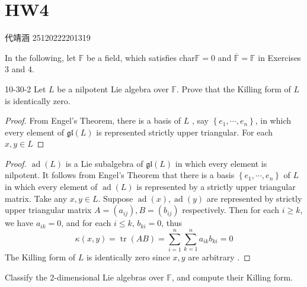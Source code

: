 \documentclass[../main.tex]{subfiles}
\begin{document}
\ifSubfilesClassLoaded{

    
    \setcounter{chapter}{3}
}{}

\chapter{ HW4 }
代靖涵 25120222201319




In the following, let $\mathbb{F}$ be a field, which satisfies char$\mathbb{F} = 0$ and $\overline{\mathbb{F}} = \mathbb{F}$ in Exercises 3 and 4.

\begin{exercise}{}{10-30-2}
Let $L$ be a nilpotent Lie algebra over $\mathbb{F}$. Prove that the Killing form of $L$ is identically zero.
\end{exercise}
\begin{proof}
    From Engel's Theorem, there is a basis of  \(  L  \) , say \(  \left\{  e_1,\cdots,e_n  \right\}  \),  in which every element of \(  \mathfrak{gl}\left( L \right)   \) is represented strictly upper triangular. For each \(  x ,y \in L  \)   
\end{proof}
\begin{proof}
\(  \operatorname{ad}\left( L \right)   \)  is a Lie subalgebra of \(  \mathfrak{gl}\left( L \right)   \) in which every element is nilpotent. It follows from Engel's Theorem that  there is a basis \(  \left\{ e_1,\cdots ,e_{n} \right\}  \)   of \(  L  \) in which  every element of \(  \operatorname{ad}\left( L \right)   \) is represented by a strictly upper triangular matrix. Take any \(  x,y \in L  \). Suppose \(  \operatorname{ad}\left( x \right)   , \operatorname{ad}\left( y \right) \) are represented by  strictly upper triangular matrix \(  A= \left( a_{ij} \right), B= \left( b_{ij} \right)    \) respectively. Then for each \(  i\ge  k  \), we have \(  a_{ik}= 0  \), and for each \(  i \le k \),  \(  b_{ki}= 0  \), thus \[
 \kappa \left( x,y \right)= \operatorname{tr}\left( AB \right)=\sum _{i= 1}^{n} \sum _{k= 1}^{n}a_{ik}b_{ki}  = 0
\]    The Killing form of \(  L  \) is identically zero since \(  x,y  \) are arbitrary . 
\end{proof}
\begin{exercise}{}{}
Classify the 2-dimensional Lie algebras over $\mathbb{F}$, and compute their Killing form.
\end{exercise}
\end{document}
